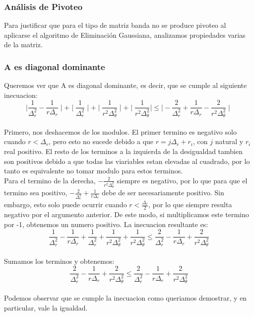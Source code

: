 \subsubsection{Análisis de Pivoteo}

Para justificar que para el tipo de matriz banda no se produce pivoteo al aplicarse el algoritmo de Eliminación Gaussiana, analizamos propiedades varias de la matriz.


\subsubsection{A es diagonal dominante}
Queremos ver que A es diagonal dominante, es decir, que se cumple al siguiente inecuacion:\\
$$\mid \frac{1}{\Delta^2_r}-\frac{1}{r \Delta_r}\mid +
\mid \frac{1}{\Delta^2_r} \mid + 
\mid \frac{1}{r^2 \Delta^2_\theta} \mid +
\mid \frac{1}{r^2 \Delta^2_\theta} \mid
\leq \mid -\frac{2}{\Delta^2_r}+\frac{1}{r \Delta_r}-\frac{2}{r^2 \Delta^2_\theta} \mid$$  \\
Primero, nos deshacemos de los modulos. El primer termino es negativo solo cuando $r < {\Delta_r}$, pero esto no sucede debido a que $r= j \Delta_r + r_i$, con $j$ natural y $r_i$ real positivo. El resto de los terminos a la izquierda de la desigualdad tambien son positivos debido a que todas las viariables estan elevadas al cuadrado, por lo tanto es equivalente no tomar modulo para estos terminos. \\
Para el termino de la derecha, $-\frac{2}{r^2 \Delta^2_\theta}$ siempre es negativo, por lo que para que el termino sea positivo, $-\frac{2}{\Delta^2_r}+\frac{1}{r \Delta_r}$ debe de ser necesariamente positivo. Sin embargo, esto solo puede ocurrir cuando $r < \frac{\Delta_r}{2}$, por lo que siempre resulta negativo por el argumento anterior. De este modo, si multiplicamos este termino por -1, obtenemos un numero positivo. La inecuacion resultante es: \\ 
$$ \frac{1}{\Delta^2_r}-\frac{1}{r \Delta_r} +  
\frac{1}{\Delta^2_r} + 
\frac{1}{r^2 \Delta^2_\theta} +
\frac{1}{r^2 \Delta^2_\theta}
\leq \frac{2}{\Delta^2_r}-\frac{1}{r \Delta_r}+\frac{2}{r^2 \Delta^2_\theta}$$ \\

Sumamos los terminos y obtenemos: \\
$$\frac{2}{\Delta^2_r}-\frac{1}{r \Delta_r}+\frac{2}{r^2 \Delta^2_\theta} \leq \frac{2}{\Delta^2_r}-\frac{1}{r \Delta_r}+\frac{2}{r^2 \Delta^2_\theta}$$ \\
Podemos observar que se cumple la inecuacion como queriamos demostrar, y en particular, vale la igualdad.

